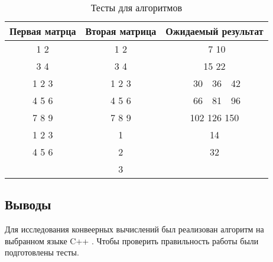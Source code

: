 \begin{table}[H]
    \caption{Тесты для алгоритмов}
    \label{table:test}
    \centering
    \begin{tabular}{|c|c|c|}
        \hline
        Первая матрца & Вторая матрица & Ожидаемый результат \\
        \hline
        1 2 & 1 2 & \ 7 10 \\
        3 4 & 3 4 & 15 22 \\
        \hline
        1 2 3 & 1 2 3 & \ 30\ \ 36\ \ 42 \\
        4 5 6 & 4 5 6 & \ 66\ \ 81\ \ 96 \\
        7 8 9 & 7 8 9 & 102 126 150 \\
        \hline
        1 2 3 & 1 & 14 \\
        4 5 6 & 2 & 32 \\
              & 3 & \\
        \hline
    \end{tabular}
\end{table}

\subsection{Выводы}

Для исследования конвеерных вычислений был реализован алгоритм на выбранном языке
{ \ttfamily C++ }. Чтобы проверить правильность работы были подготовлены тесты.
